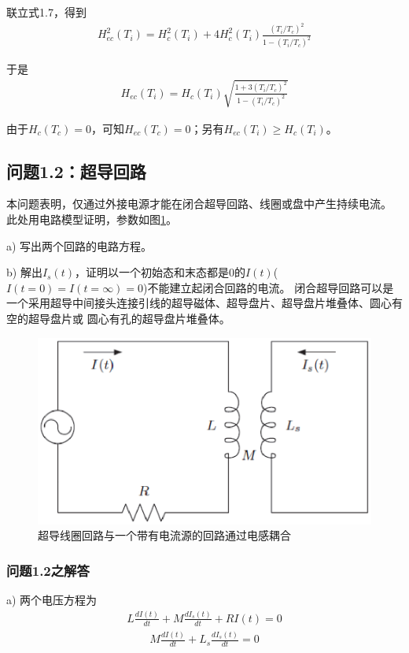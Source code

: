 联立式1.7，得到
\begin{align*}
H_{ec}^2(T_i)=H_c^2(T_i)+4H_c^2(T_i)\frac{(T_i/T_c)^2}{1-(T_i/T_c)^2} \tag{S1.24}
\end{align*}

于是
\begin{align*}
H_{ec}(T_i)=H_c(T_i)\sqrt{\frac{1+3(T_i/T_c)^2}{1-(T_i/T_c)^2}}
\end{align*}

由于$H_c(T_c)=0$，可知$H_{ec}(T_c)=0$；另有$H_{ec}(T_i)\ge H_c(T_i)$。


\subsection{问题1.2：超导回路}
本问题表明，仅通过外接电源才能在闭合超导回路、线圈或盘中产生持续电流。
此处用电路模型证明，参数如图\ref{scloop}。
 
a) 写出两个回路的电路方程。

b) 解出$I_s(t)$，证明以一个初始态和末态都是0的$I(t)$($I(t=0)=I(t=\infty)=0$)不能建立起闭合回路的电流。
闭合超导回路可以是一个采用超导中间接头连接引线的超导磁体、超导盘片、超导盘片堆叠体、圆心有空的超导盘片或
圆心有孔的超导盘片堆叠体。

\begin{figure}[htbp]
  \centering
 \includegraphics[scale=0.6]{chpt1/figs/fig1.8.eps}
  \caption{
超导线圈回路与一个带有电流源的回路通过电感耦合
}\label{scloop}
\end{figure}

\subsubsection{问题1.2之解答}
a) 两个电压方程为
\begin{align*}
L\frac{dI(t)}{dt}+M\frac{dI_s(t)}{dt}+ RI(t) = 0 \tag{S2.1a}
\end{align*}
\begin{align*}
M\frac{dI(t)}{dt}+ L_s\frac{dI_s(t)}{dt}= 0 \tag{S2.1b}
\end{align*}

